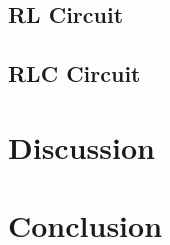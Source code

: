 \documentclass{article}
\begin{document}
  \subsection{RL Circuit}

  \subsection{RLC Circuit}

\section{Discussion}

\section{Conclusion}
\end{document}
